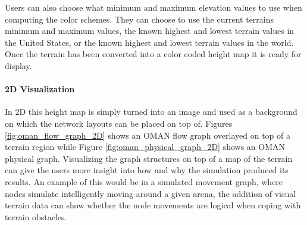 Users can also choose what minimum and maximum elevation values to use when computing the color schemes.  They can choose to use the current terrains minimum and maximum values, the known highest and lowest terrain values in the United States, or the known highest and lowest terrain values in the world.  Once the terrain has been converted into a color coded height map it is ready for display.  

\paragraph{2D Visualization}
In 2D this height map is simply turned into an image and used as a background on which the network layouts can be placed on top of.  Figures \ref{fig:oman_flow_graph_2D} shows an OMAN flow graph overlayed on top of a terrain region while Figure \ref{fig:oman_physical_graph_2D} shows an OMAN physical graph.  Visualizing the graph structures on top of a map of the terrain can give the users more insight into how and why the simulation produced its results.  An example of this would be in a simulated movement graph, where nodes simulate intelligently moving around a given arena, the addition of visual terrain data can show whether the node movements are logical when coping with terrain obstacles.


